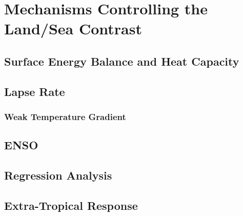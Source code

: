 \chapter{Mechanisms Controlling the Land/Sea Contrast} 

\label{mechanisms} 




\section{Surface Energy Balance and Heat Capacity}


\section{Lapse Rate}

\subsection{Weak Temperature Gradient}




\section{ENSO}




\section{Regression Analysis}



\section{Extra-Tropical Response}